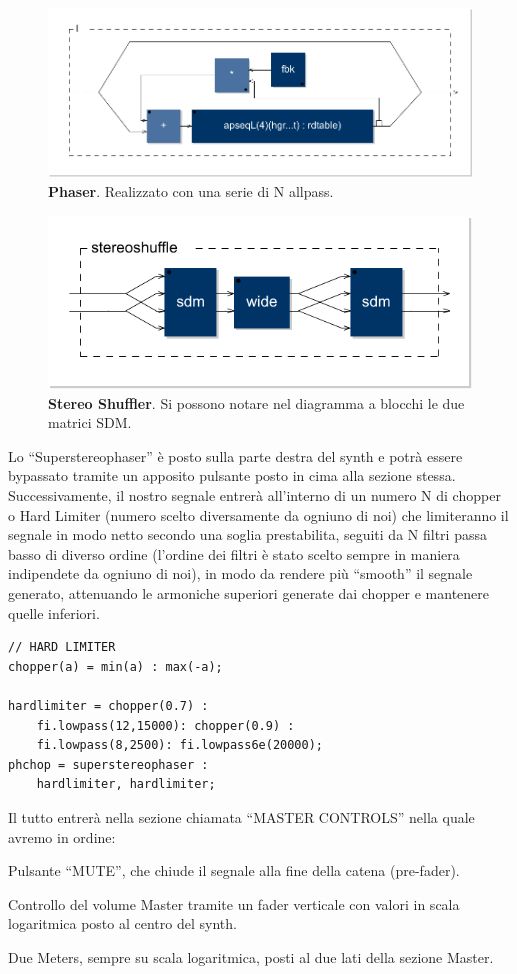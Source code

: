 \documentclass[
	a4paper,
	twocolumn
	]{article}
\begin{document}
\begin{figure}[h]
\begin{center}
\includegraphics[width=.47\textwidth]{img/phaser}
\caption{\textbf{Phaser}. Realizzato con una serie di N allpass.}
\label{phaser}
\end{center}
\end{figure}

\begin{figure}[h]
\begin{center}
\includegraphics[width=.47\textwidth]{img/mid-side-shuffler}
\caption{\textbf{Stereo Shuffler}. Si possono notare nel diagramma a blocchi le due matrici SDM.}
\label{stereoshuffler}
\end{center}
\end{figure}

Lo “Superstereophaser” è posto sulla parte destra del synth e potrà essere bypassato tramite un apposito pulsante posto in cima alla sezione stessa.
Successivamente, il nostro segnale entrerà all’interno di un numero N di chopper o Hard Limiter (numero scelto diversamente da ogniuno di noi) che limiteranno il segnale in modo netto secondo una soglia prestabilita, seguiti da N filtri passa basso di diverso ordine (l'ordine dei filtri è stato scelto sempre in maniera indipendete da ogniuno di noi), in modo da rendere più “smooth” il segnale generato, attenuando le armoniche superiori generate dai chopper e mantenere quelle inferiori.

\begin{lstlisting}
// HARD LIMITER
chopper(a) = min(a) : max(-a);

hardlimiter = chopper(0.7) :
	fi.lowpass(12,15000): chopper(0.9) :
	fi.lowpass(8,2500): fi.lowpass6e(20000);
phchop = superstereophaser :
	hardlimiter, hardlimiter;
 \end{lstlisting}

Il tutto entrerà nella sezione chiamata “MASTER CONTROLS” nella quale avremo in ordine:
\begin{compactitem}
\item Pulsante “MUTE”, che chiude il segnale alla fine della catena (pre-fader).
\item Controllo del volume Master tramite un fader verticale con valori in scala logaritmica posto al centro del synth.
\item Due Meters, sempre su scala logaritmica, posti al due lati della sezione Master.
\end{compactitem}
\end{document}
